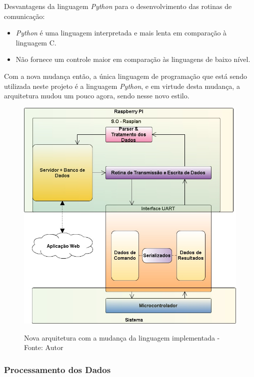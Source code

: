 Desvantagens da linguagem \textit{Python} para o desenvolvimento das rotinas de comunicação:

\begin{itemize}
    \item \textit{Python} é uma linguagem interpretada e mais lenta em comparação à linguagem C.
    \item Não fornece um controle maior em comparação às linguagens de baixo nível.
\end{itemize}

Com a nova mudança então, a única linguagem de programação que está sendo utilizada neste projeto é a linguagem \textit{Python}, e em virtude 
desta mudança, a arquitetura mudou um pouco agora, sendo nesse novo estilo.

\begin{figure}[H]
\centering
\includegraphics[keepaspectratio=true,scale=0.7]{figuras/nova_arquitetura.png}
\label{fig:nova_arquitetura}
\caption{Nova arquitetura com a mudança da linguagem implementada - Fonte: Autor}
\end{figure}

\subsubsection*{\textbf{Processamento dos Dados}} \label{software:processamento}

